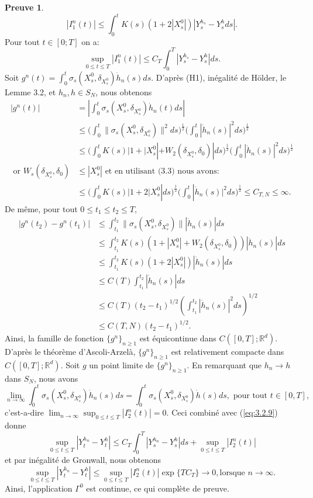 \documentclass[12pt,a4paper,twoside]{report}%
\theoremstyle{definition}
\newtheorem*{pr}{\textbf{Preuve}}
\numberwithin{equation}{section}
\begin{document}
\begin{pr}
	 	\[
	 	|I_1^n(t)| \leq \int_{0}^{t} K(s)(1 + 2|X_s^0|)|Y_s^{h_s}-Y_s^hds|.
	 	\]
Pour tout $t\in [0;T]$ on a:
\begin{equation}\label{eq:3.2.9}
	\sup_{0 \leq t \leq T}	|I_1^n(t)| \leq C_T\int_{0}^{T} |Y_s^{h_s}-Y_s^h|ds.
\end{equation}
Soit  $g^n(t) = \int_0^t \sigma_s (X_s^0, \delta_{X_s^0}) \dot{h}_n(s) ds$. D'après (H1), inégalité de Hölder, le Lemme 3.2, et \( h_n, h \in S_N \), nous obtenons 
\[
\begin{aligned}
|g^n(t)| &= |\int_{0}^{t}\sigma_s(X_s^0,\delta_{X_s^0})\dot{h}_n(t)ds|\\
&\leq\Big(\int_{0}^{t}\|\sigma_s(X_s^0,\delta_{X_s^0})\|^2ds\Big)^\frac{1}{2}\Big(\int_{0}^{t}|\dot{h}_n(s)|^2ds\Big)^\frac{1}{2}\\
	&\leq \Big(\int_{0}^{t}K(s)|1 + |X_s^0| + W_2(\delta_{X_s^0},\delta_0)|ds\Big)^\frac{1}{2}\Big(\int_{0}^{t}|\dot{h}_n(s)|^2ds\Big)^\frac{1}{2}\\
	\text{ or } W_s(\delta_{X_s^0},\delta_0) &\leq |X_s^0| \text{ et en utilisant (3.3) nous avons: }\\
	&\leq \Big(\int_{0}^{t}K(s)|1 + 2|X_s^0| ds\Big)^\frac{1}{2}\Big(\int_{0}^{t}|\dot{h}_n(s)|^2ds\Big)^\frac{1}{2}\leq C_{T,N}\leq\infty.
\end{aligned}
\]
De même, pour tout $0\leq t_1\leq t_2\leq T,$
\[\begin{aligned}
	|g^n(t_2) - g^n(t_1)| &\leq \int_{t_1}^{t_2} \|\sigma_s (X_s^0, \delta_{X_s^0})\| |\dot{h}_n(s)| ds\\
&\leq \int_{t_1}^{t_2} K(s)(1 + |X_s^0| + W_2(\delta_{X_s^0}, \delta_0)) |\dot{h}_n(s)| ds\\
	&\leq \int_{t_1}^{t_2} K(s)(1 + 2|X_s^0|) |\dot{h}_n(s)| ds\\
	&\leq C(T)\int_{t_1}^{t_2}|\dot{h}_n(s)|ds\\
&\leq C(T)(t_2 - t_1)^{1/2} \left( \int_{t_1}^{t_2} |\dot{h}_n(s)|^2 ds \right)^{1/2}\\
&\leq C(T, N)(t_2 - t_1)^{1/2}.
\end{aligned}\]
Ainsi, la famille de fonction $\{g^n\}_{n\geq 1}$ est équicontinue dans \(C([0, T]; \mathbb{R}^d) \). D'après le théorème  d'Ascoli-Arzelà, \(\{g^n\}_{n \geq 1}\) est relativement compacte dans \(C([0, T]; \mathbb{R}^d) \). Soit \( g \) un point limite de \(\{g^n\}_{n \geq 1}\). En remarquant que \( h_n \to h \) dans \( S_N \), nous avons
\[\lim_{n \to \infty} \int_0^t \sigma_s (X_s^0, \delta_{X_s^0}) \dot{h}_n(s) ds = \int_0^t \sigma_s (X_s^0, \delta_{X_s^0}) \dot{h}(s) ds, \text{ pour tout } t \in [0, T],\]
c'est-a-dire $\lim_{n \to \infty}\sup_{0 \leq t \leq T}|I_2^n(t)| = 0.$ Ceci combiné avec (\ref{eq:3.2.9}) donne
\[
\sup_{0 \leq t \leq T}|Y_t^{h_n}-Y_t^{h}|\leq C_T\int_{0}^{T}|Y_s^{h_n}-Y_s^h| ds + \sup_{0 \leq t \leq T}|I_2^n(t)|
\]
et par inégalité de Gronwall, nous obtenons
\[
\sup_{0 \leq t \leq T}|Y_t^{h_n}-Y_t^{h}|\leq\sup_{0 \leq t \leq T}|I_2^n(t)|\exp\{TC_T\}\to 0, \text{lorsque } n \to \infty.
\]
Ainsi, l'application $\Gamma^0$ est continue, ce qui complète de preuve.
\end{pr}
	 
\end{document}
